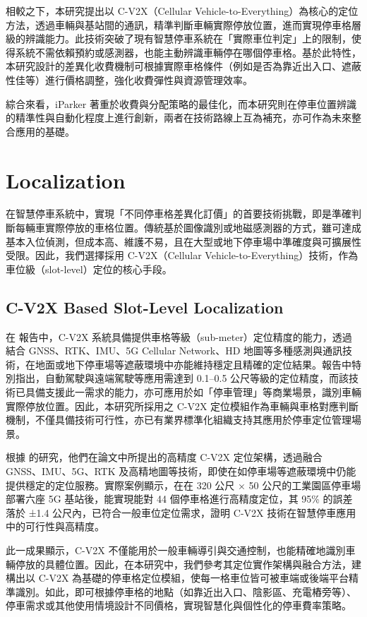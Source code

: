 \documentclass[sigconf,authorversion,nonacm,screen]{acmart}
\begin{document}
相較之下，本研究提出以 C-V2X（Cellular Vehicle-to-Everything）為核心的定位方法，透過車輛與基站間的通訊，精準判斷車輛實際停放位置，進而實現停車格層級的辨識能力。此技術突破了現有智慧停車系統在「實際車位判定」上的限制，使得系統不需依賴預約或感測器，也能主動辨識車輛停在哪個停車格。基於此特性，本研究設計的差異化收費機制可根據實際車格條件（例如是否為靠近出入口、遮蔽性佳等）進行價格調整，強化收費彈性與資源管理效率。

綜合來看，iParker 著重於收費與分配策略的最佳化，而本研究則在停車位置辨識的精準性與自動化程度上進行創新，兩者在技術路線上互為補充，亦可作為未來整合應用的基礎。

\section{Localization}
\quad 在智慧停車系統中，實現「不同停車格差異化訂價」的首要技術挑戰，即是準確判斷每輛車實際停放的車格位置。傳統基於圖像識別或地磁感測器的方式，雖可達成基本入位偵測，但成本高、維護不易，且在大型或地下停車場中準確度與可擴展性受限。因此，我們選擇採用 C-V2X（Cellular Vehicle-to-Everything）技術，作為車位級（slot-level）定位的核心手段。

\subsection{C-V2X Based Slot-Level Localization}
\quad 在\citet{5gaa2021v2xhap} 報告中，C-V2X 系統具備提供車格等級（sub-meter）定位精度的能力，透過結合 GNSS、RTK、IMU、5G Cellular Network、HD 地圖等多種感測與通訊技術，在地面或地下停車場等遮蔽環境中亦能維持穩定且精確的定位結果。報告中特別指出，自動駕駛與遠端駕駛等應用需達到 0.1–0.5 公尺等級的定位精度，而該技術已具備支援此一需求的能力，亦可應用於如「停車管理」等商業場景，識別車輛實際停放位置。因此，本研究所採用之 C-V2X 定位模組作為車輛與車格對應判斷機制，不僅具備技術可行性，亦已有業界標準化組織支持其應用於停車定位管理場景。

根據 \citet{liu2021highly} 的研究，他們在論文中所提出的高精度 C-V2X 定位架構，透過融合 GNSS、IMU、5G、RTK 及高精地圖等技術，即使在如停車場等遮蔽環境中仍能提供穩定的定位服務。實際案例顯示，在在 320 公尺 × 50 公尺的工業園區停車場部署六座 5G 基站後，能實現能對 44 個停車格進行高精度定位，其 95\% 的誤差落於 ±1.4 公尺內，已符合一般車位定位需求，證明 C-V2X 技術在智慧停車應用中的可行性與高精度。

此一成果顯示，C-V2X 不僅能用於一般車輛導引與交通控制，也能精確地識別車輛停放的具體位置。因此，在本研究中，我們參考其定位實作架構與融合方法，建構出以 C-V2X 為基礎的停車格定位模組，使每一格車位皆可被車端或後端平台精準識別。如此，即可根據停車格的地點（如靠近出入口、陰影區、充電樁旁等）、停車需求或其他使用情境設計不同價格，實現智慧化與個性化的停車費率策略。
\end{document}
